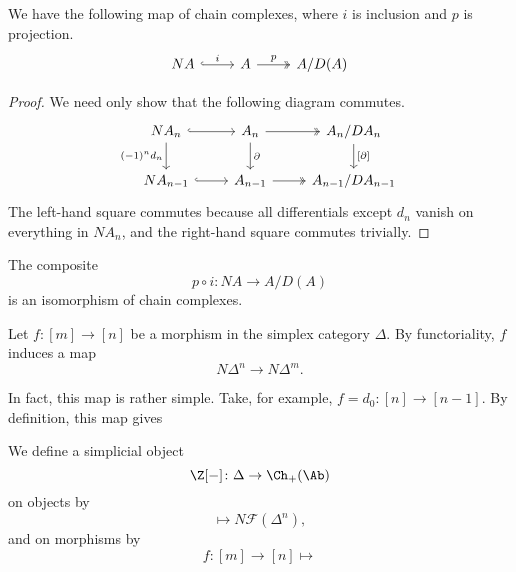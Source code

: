 \documentclass[main.tex]{subfiles}
\begin{document}
\begin{lemma}
  We have the following map of chain complexes, where $i$ is inclusion and $p$ is projection.
  \begin{equation*}
    \begin{tikzcd}
      NA
      \arrow[r, hook, "i"]
      & A
      \arrow[r, two heads, "p"]
      & A/D(A)
    \end{tikzcd}
  \end{equation*}
\end{lemma}
\begin{proof}
  We need only show that the following diagram commutes.
  \begin{equation*}
    \begin{tikzcd}
      NA_{n}
      \arrow[r, hook]
      \arrow[d, swap, "(-1)^{n} d_{n}"]
      & A_{n}
      \arrow[r, two heads]
      \arrow[d, "\partial"]
      & A_{n}/DA_{n}
      \arrow[d, "{[\partial]}"]
      \\
      NA_{n-1}
      \arrow[r, hook]
      & A_{n-1}
      \arrow[r, two heads]
      & A_{n-1}/DA_{n-1}
    \end{tikzcd}
  \end{equation*}
  The left-hand square commutes because all differentials except $d_{n}$ vanish on everything in $NA_{n}$, and the right-hand square commutes trivially.
\end{proof}

\begin{theorem}
  The composite
  \begin{equation*}
    p \circ i\colon NA \to A/D(A)
  \end{equation*}
  is an isomorphism of chain complexes.
\end{theorem}

Let $f\colon [m] \to [n]$ be a morphism in the simplex category $\Delta$. By functoriality, $f$ induces a map
\begin{equation*}
  N \Delta^{n} \to N \Delta^{m}.
\end{equation*}

In fact, this map is rather simple. Take, for example, $f = d_{0}\colon [n] \to [n-1]$. By definition, this map gives


We define a simplicial object
\begin{equation*}
  \Z[-]\colon \Delta \to \Ch_{+}(\Ab)
\end{equation*}
on objects by
\begin{equation*}
  [n] \mapsto N \mathcal{F}(\Delta^{n}),
\end{equation*}
and on morphisms by
\begin{equation*}
  f\colon [m] \to [n] \mapsto
\end{equation*}
\end{document}
